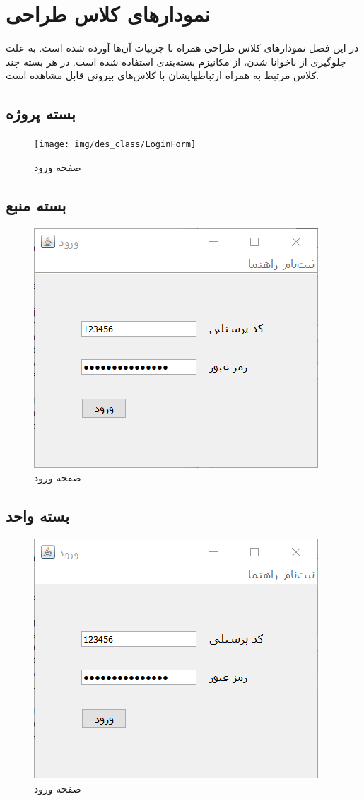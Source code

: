 \chapter{نمودارهای کلاس طراحی}
در این فصل نمودارهای کلاس طراحی همراه با جزییات آن‌ها آورده شده است. به علت جلوگیری از ناخوانا شدن، از مکانیزم بسته‌بندی
استفاده شده است. در هر بسته چند کلاس مرتبط به همراه ارتباطهایشان با کلاس‌های بیرونی قابل مشاهده است.
\section{بسته پروژه}
\begin{figure}[H]
	\centering
	\texttt{[image: img/des\_class/LoginForm]}
	\caption{صفحه ورود}
\end{figure}

\section{بسته منبع}
\begin{figure}[H]
	\centering
	\includegraphics[scale=0.8]{img/prot/LoginForm}
	\caption{صفحه ورود}
\end{figure}

\section{بسته واحد}
\begin{figure}[H]
	\centering
	\includegraphics[scale=0.8]{img/prot/LoginForm}
	\caption{صفحه ورود}
\end{figure}

